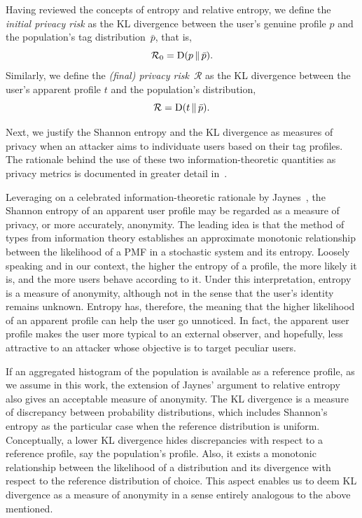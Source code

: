 Having reviewed the concepts of entropy and relative entropy, we define the \emph{initial privacy risk} as the KL divergence between the user's genuine profile $p$ and the population's tag distribution~$\bar{p}$, that is, $$\mathcal{R}_0 = \operatorname{D}(p\,\|\,\bar{p}).$$
Similarly, we define the \emph{(final) privacy risk}~$\mathcal{R}$ as the KL divergence between the user's apparent profile $t$ and the population's distribution, $$\mathcal{R}=\operatorname{D}(t\,\|\,\bar{p}).$$

Next, we justify the Shannon entropy and the KL divergence as measures of privacy when an attacker aims to individuate users based on their tag profiles.
The rationale behind the use of these two information-theoretic quantities as privacy metrics is documented in greater detail in~\cite{parra2014measuring}.

Leveraging on a celebrated information-theoretic rationale by Jaynes~\cite{Jaynes82P}, the Shannon entropy of an apparent user profile may be regarded as a measure of privacy, or more accurately, anonymity.
The leading idea is that the method of types from information theory establishes an approximate monotonic relationship between the likelihood of a PMF in a stochastic system and its entropy. Loosely speaking and in our context, the higher the entropy of a profile, the more likely it is, and the more users behave according to it. Under this interpretation, entropy is a measure of anonymity, although not in the sense that the user's identity remains unknown. Entropy has, therefore, the meaning that the higher likelihood of an apparent profile can help the user go unnoticed. In fact, the apparent user profile makes the user more typical to an external observer, and hopefully, less attractive to an attacker whose objective is to target peculiar users.

If an aggregated histogram of the population is available as a reference profile, as we assume in this work, the extension of Jaynes' argument to relative entropy also gives an acceptable measure of anonymity.
The KL divergence is a measure of discrepancy between probability distributions, which includes Shannon's entropy as the particular case when the reference distribution is uniform.
Conceptually, a lower KL divergence hides discrepancies with respect to a reference profile, say the population's profile. Also, it exists a monotonic relationship between the likelihood of a distribution and its divergence with respect to the reference distribution of choice. This aspect enables us to deem KL divergence as a measure of anonymity in a sense entirely analogous to the above mentioned.

